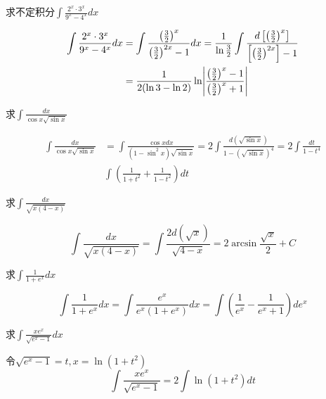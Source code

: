 \documentclass{article}
\begin{document}
\begin{examplle}[]
求不定积分\(\displaystyle\int\frac{2^x\cdot 3^x}{9^x-4^x}dx\)

\begin{align*}
\int\frac{2^x\cdot 3^x}{9^x-4^x}dx&=
\int\frac{\left(\frac{3}{2}\right)^x}{\left(\frac{3}{2}\right)^{2x}-1}dx=
\frac{1}{\ln\frac{3}{2}}\int\frac{d\left[\left(\frac{3}{2}\right)^x\right]}
{\left[\left(\frac{3}{2}\right)^{2x}\right]-1}\\
&=\frac{1}{2(\ln3-\ln2)}\ln\abs{\frac{\left(\frac{3}{2}\right)^x-1}
{\left(\frac{3}{2}\right)^x+1}}
\end{align*}
\end{examplle}

\begin{examplle}[]
求\(\displaystyle\int\frac{dx}{\cos x\sqrt{\sin x}}\)

\begin{align*}
\int\frac{dx}{\cos x\sqrt{\sin x}}&=
\int\frac{\cos xdx}{(1-\sin^2x)\sqrt{\sin x}}=
2\int\frac{d(\sqrt{\sin x})}{1-(\sqrt{\sin x})^4}=2\int\frac{dt}{1-t^4}\\
&\int\left(\frac{1}{1+t^2}+\frac{1}{1-t^2}\right)dt
\end{align*}
\end{examplle}

\begin{examplle}[]
求\(\displaystyle\int\frac{dx}{\sqrt{x(4-x)}}\)

\begin{equation*}
\int\frac{dx}{\sqrt{x(4-x)}}=
\int\frac{2d(\sqrt{x})}{\sqrt{4-x}}=2\arcsin\frac{\sqrt{x}}{2}+C
\end{equation*}
\end{examplle}

\begin{examplle}[]
求\(\displaystyle\int\frac{1}{1+e^x}dx\)

\begin{equation*}
\int\frac{1}{1+e^x}dx=\int\frac{e^x}{e^x(1+e^x)}dx=
\int\left(\frac{1}{e^x}-\frac{1}{e^x+1}\right)de^x
\end{equation*}
\end{examplle}

\begin{examplle}[]
求\(\displaystyle\int\frac{xe^x}{\sqrt{e^x-1}}dx\)

令\(\sqrt{e^x-1}=t,x=\ln(1+t^2)\)
\begin{equation*}
\int\frac{xe^x}{\sqrt{e^x-1}}=2\int\ln(1+t^2)dt
\end{equation*}
\end{examplle}
\end{document}

